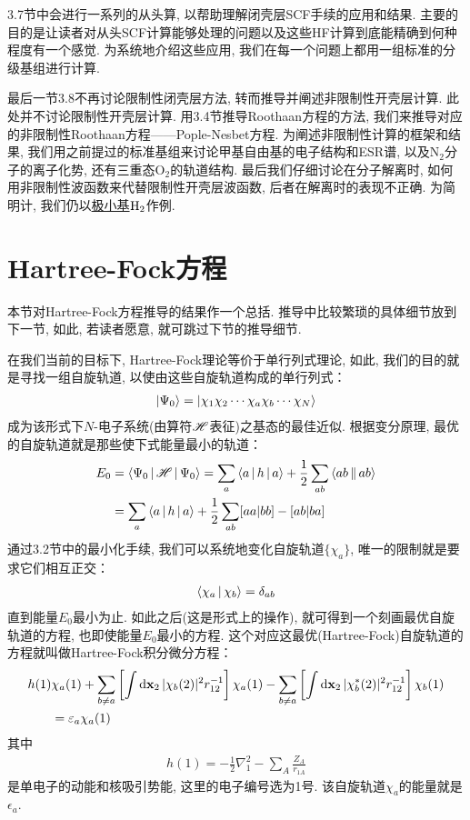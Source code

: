 3.7节中会进行一系列的从头算, 以帮助理解闭壳层SCF手续的应用和结果. 主要的目的是让读者对从头SCF计算能够处理的问题以及这些HF计算到底能精确到何种程度有一个感觉. 为系统地介绍这些应用, 我们在每一个问题上都用一组标准的分级基组进行计算.

最后一节3.8不再讨论限制性闭壳层方法, 转而推导并阐述非限制性开壳层计算. 此处并不讨论限制性开壳层计算. 用3.4节推导Roothaan方程的方法, 我们来推导对应的非限制性Roothaan方程——Pople-Nesbet方程. 为阐述非限制性计算的框架和结果, 我们用之前提过的标准基组来讨论甲基自由基的电子结构和ESR谱, 以及$\mathrm{N}_2$分子的离子化势, 还有三重态$\mathrm{O}_2$的轨道结构. 最后我们仔细讨论在分子解离时, 如何用非限制性波函数来代替限制性开壳层波函数, 后者在解离时的表现不正确. 为简明计, 我们仍以\underline{极小基$\mathrm{H}_2$}作例.

\section{Hartree-Fock方程}
本节对Hartree-Fock方程推导的结果作一个总括. 推导中比较繁琐的具体细节放到下一节, 如此, 若读者愿意, 就可跳过下节的推导细节. 

在我们当前的目标下, Hartree-Fock理论等价于单行列式理论, 如此, 我们的目的就是寻找一组自旋轨道, 以使由这些自旋轨道构成的单行列式：
\begin{align}
\Ket{\Psi_0} = \Ket{\chi_1\chi_2\cdots\chi_a\chi_b\cdots\chi_N}
\end{align}
成为该形式下$N$-电子系统(由算符$\mathscr{H}$表征)之基态的最佳近似. 根据变分原理, 最优的自旋轨道就是那些使下式能量最小的轨道：
\begin{align}
E_0 & = \Braket{\Psi_0|\mathscr{H}|\Psi_0} = \sum_a\Braket{a|h|a} + \frac{1}{2}\sum_{ab}\Braket{ab||ab}\notag \\
    & = \sum_a\Braket{a|h|a} + \frac{1}{2}\sum_{ab}[aa|bb]-[ab|ba]
\end{align}
通过3.2节中的最小化手续, 我们可以系统地变化自旋轨道$\{\chi_a\}$, 唯一的限制就是要求它们相互正交：
\begin{align}
\Braket{\chi_a|\chi_b} = \delta_{ab}
\end{align} 
直到能量$E_0$最小为止. 如此之后(这是形式上的操作), 就可得到一个刻画最优自旋轨道的方程, 也即使能量$E_0$最小的方程. 这个对应这最优(Hartree-Fock)自旋轨道的方程就叫做Hartree-Fock积分微分方程：
\begin{align}
\label{3.4}
h(1)&\chi_a(1) + \sum_{b\neq a}\left[ \int\dd{x}_2\,|\chi_b(2)|^2 r_{12}^{-1} \right]\chi_a(1) - \sum_{b\neq a}\left[ \int\dd{x}_2\,|\chi_b^*(2)|^2 r_{12}^{-1} \right]\chi_b(1)\notag\\
&=\epsilon_a\chi_a(1)
\end{align}
其中
\begin{align}
h(1) = -\frac{1}{2}\nabla_1^2 - \sum_A\frac{Z_A}{r_{1A}}
\end{align}
是单电子的动能和核吸引势能, 这里的电子编号选为1号. 该自旋轨道$\chi_a$的能量就是$\epsilon_a$.


